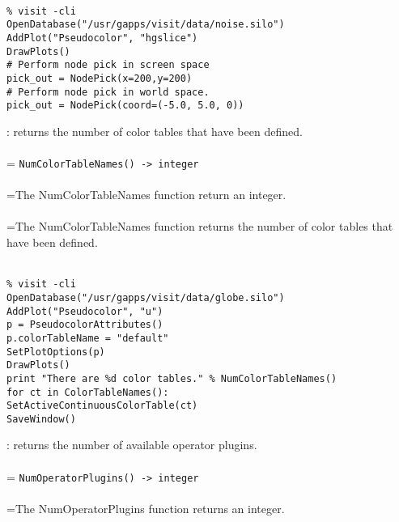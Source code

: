 \documentclass[10pt,a4paper]{report}
\begin{document}
\\[-6mm]
\begin{verbatim}% visit -cli
OpenDatabase("/usr/gapps/visit/data/noise.silo")
AddPlot("Pseudocolor", "hgslice")
DrawPlots()
# Perform node pick in screen space
pick_out = NodePick(x=200,y=200)
# Perform node pick in world space.
pick_out = NodePick(coord=(-5.0, 5.0, 0))
\end{verbatim}
\newpage


{}
: returns the number of color tables that have been defined.\\[-3mm]

 \\ 
\hangindent=\parindent 
\verb!NumColorTableNames() -> integer!\\ [-3mm]

 \\ 
\hangindent=\parindent The NumColorTableNames function return an integer. \\[-3mm] 

 \\ 
\hangindent=\parindent The NumColorTableNames function returns the number of color tables that have been defined. \\[-3mm] 

\\[-6mm]
\begin{verbatim}% visit -cli
OpenDatabase("/usr/gapps/visit/data/globe.silo")
AddPlot("Pseudocolor", "u")
p = PseudocolorAttributes()
p.colorTableName = "default"
SetPlotOptions(p)
DrawPlots()
print "There are %d color tables." % NumColorTableNames()
for ct in ColorTableNames():
SetActiveContinuousColorTable(ct)
SaveWindow()
\end{verbatim}
\newpage


{}
: returns the number of available operator plugins.\\[-3mm]

 \\ 
\hangindent=\parindent 
\verb!NumOperatorPlugins() -> integer!\\ [-3mm]

 \\ 
\hangindent=\parindent The NumOperatorPlugins function returns an integer. \\[-3mm] 
\end{document}
